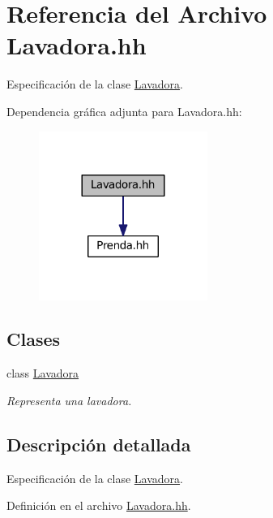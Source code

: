 \hypertarget{_lavadora_8hh}{\section{Referencia del Archivo Lavadora.\-hh}
\label{_lavadora_8hh}
}


Especificación de la clase \hyperlink{class_lavadora}{Lavadora}.  


Dependencia gráfica adjunta para Lavadora.\-hh\-:\nopagebreak
\begin{figure}[H]
\begin{center}
\leavevmode
\includegraphics[width=156pt]{_lavadora_8hh__incl}
\end{center}
\end{figure}
\subsection*{Clases}
\begin{DoxyCompactItemize}
\item 
class \hyperlink{class_lavadora}{Lavadora}
\begin{DoxyCompactList}\small\item\em Representa una lavadora. \end{DoxyCompactList}\end{DoxyCompactItemize}


\subsection{Descripción detallada}
Especificación de la clase \hyperlink{class_lavadora}{Lavadora}. 

Definición en el archivo \hyperlink{_lavadora_8hh_source}{Lavadora.\-hh}.

